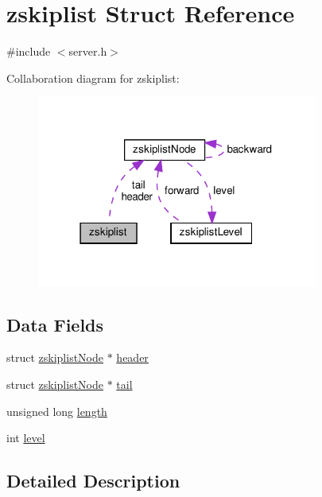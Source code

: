 \hypertarget{structzskiplist}{}\section{zskiplist Struct Reference}
\label{structzskiplist}


{\ttfamily \#include $<$server.\+h$>$}



Collaboration diagram for zskiplist\+:
\nopagebreak
\begin{figure}[H]
\begin{center}
\leavevmode
\includegraphics[width=262pt]{structzskiplist__coll__graph}
\end{center}
\end{figure}
\subsection*{Data Fields}
\begin{DoxyCompactItemize}
\item 
struct \hyperlink{structzskiplist_node}{zskiplist\+Node} $\ast$ \hyperlink{structzskiplist_ade3018e820093435bd6592a7e5667dd4}{header}
\item 
struct \hyperlink{structzskiplist_node}{zskiplist\+Node} $\ast$ \hyperlink{structzskiplist_a8901eab71c29a7f378e629e720871a13}{tail}
\item 
unsigned long \hyperlink{structzskiplist_a9ee64c7b918513891b3834b93ad0e501}{length}
\item 
int \hyperlink{structzskiplist_acf4d33ee4cff36f69b924471174dcb11}{level}
\end{DoxyCompactItemize}


\subsection{Detailed Description}


